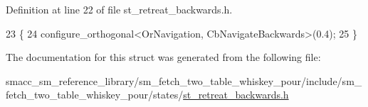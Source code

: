 Definition at line 22 of file st\+\_\+retreat\+\_\+backwards.\+h.


\begin{DoxyCode}
23         \{
24             configure\_orthogonal<OrNavigation, CbNavigateBackwards>(0.4);
25         \}
\end{DoxyCode}


The documentation for this struct was generated from the following file\+:\begin{DoxyCompactItemize}
\item 
smacc\+\_\+sm\+\_\+reference\+\_\+library/sm\+\_\+fetch\+\_\+two\+\_\+table\+\_\+whiskey\+\_\+pour/include/sm\+\_\+fetch\+\_\+two\+\_\+table\+\_\+whiskey\+\_\+pour/states/\hyperlink{st__retreat__backwards_8h}{st\+\_\+retreat\+\_\+backwards.\+h}\end{DoxyCompactItemize}
